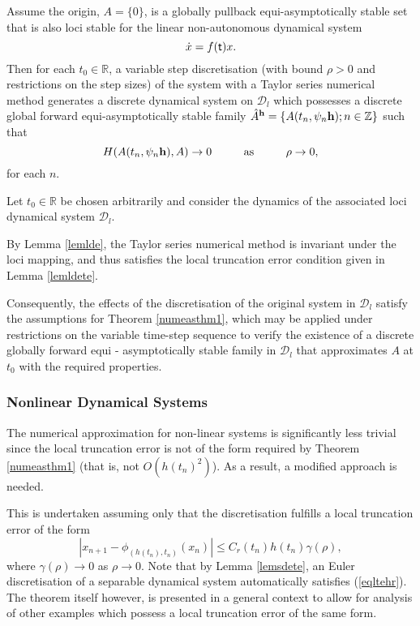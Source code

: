 \begin{therm}
Assume the origin, $A = \{ 0 \}$, is a globally pullback equi-asymptotically
stable set that is also loci stable for the linear non-autonomous dynamical
system
\[ \dot{x} = f( \mathsf{\mathsf{t}})x. \]
Then for each $t_0 \in \mathbb{R}$, a variable step discretisation
(with bound $\rho > 0$ and restrictions on the step sizes) of the system with a
Taylor series numerical method generates a discrete dynamical system on
$\mathcal{D}_l$ which possesses a discrete global
forward equi-asymptotically stable family $\hat{A}^{\bf h} = \{A(t_n, \psi_n{\bf
h}); n \in \mathbb{Z} \}$
such that
\[ H(A(t_n, \psi_n {\bf h}), A) \to 0 \hspace{1cm} \text{as} \hspace{1cm} \rho
            \to 0, \]
for each $n$.
\end{therm}
\begin{prf}
Let $t_0 \in \mathbb{R}$ be chosen arbitrarily and consider the dynamics of the
associated loci dynamical system $\mathcal{D}_l$.

By Lemma \ref{lemlde}, the Taylor series numerical method is invariant under the
loci mapping, and thus satisfies the local truncation error condition given in
Lemma \ref{lemldete}.

Consequently, the effects of the discretisation of the original system in
$\mathcal{D}_l$ satisfy the assumptions for Theorem \ref{numeasthm1}, which may
be applied under restrictions on the variable time-step sequence to verify the
existence of a discrete globally forward equi - asymptotically stable family in
$\mathcal{D}_l$ that approximates $A$ at $t_0$ with the required properties.
\end{prf}

\subsubsection{Nonlinear Dynamical Systems}

The numerical approximation for non-linear systems is significantly less trivial
since the local truncation error is not of the form required by Theorem
\ref{numeasthm1} (that is, not $O(h(t_n)^2)$). As a result, a modified approach
is needed.

This is undertaken assuming only that the discretisation fulfills a local
truncation error of the form
\begin{equation} \label{eqltehr}
 \left| x_{n+1} - \phi_{(h(t_n), t_n)}(x_n)\right| \leq C_r(t_n) h(t_n)
  \gamma(\rho),
\end{equation}
where $\gamma(\rho) \to 0$ as $\rho \to 0$. Note that by Lemma \ref{lemsdete},
an Euler discretisation of a separable dynamical system automatically satisfies
(\ref{eqltehr}).  The theorem itself however, is presented in a general context
to allow for analysis of other examples which possess a local truncation error
of the same form.

